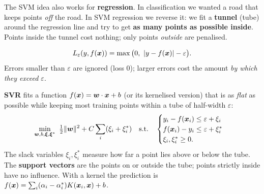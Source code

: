 The SVM idea also works for \textbf{regression}. In classification we wanted a road that keeps points \emph{off} the road. In SVM regression we reverse it: we fit a \textbf{tunnel} (tube) around the regression line and try to get \textbf{as many points as possible inside}. Points inside the tunnel cost nothing; only points \emph{outside} are penalised.

\begin{definition}
\[
  L_\varepsilon(y,f(\vect x))=\max\big(0,\ |y-f(\vect x)|-\varepsilon\big).
\]
Errors smaller than $\varepsilon$ are ignored (loss $0$); larger errors cost the amount \emph{by which they exceed $\varepsilon$}.
\end{definition}

\begin{definition}
\textbf{SVR} fits a function $f(\boldsymbol{x})=\boldsymbol{w}\cdot\boldsymbol{x}+b$ (or its kernelised version) that is as \emph{flat} as possible while keeping most training points within a tube of half-width $\varepsilon$:
\[
  \min_{\vect w,b,\vect\xi,\vect\xi^*}\ \tfrac12\|\vect w\|^2+C\sum_i(\xi_i+\xi_i^*)
  \quad\text{s.t.}\quad
  \begin{cases}y_i-f(\vect x_i)\le\varepsilon+\xi_i\\ f(\vect x_i)-y_i\le\varepsilon+\xi_i^*\\ \xi_i,\xi_i^*\ge0.\end{cases}
\]
The slack variables $\xi_i,\xi_i^*$ measure how far a point lies above or below the tube. The \textbf{support vectors} are the points on or outside the tube; points strictly inside have no influence. With a kernel the prediction is $f(\boldsymbol{x})=\sum_i(\alpha_i-\alpha_i^*)K(\boldsymbol{x}_i,\boldsymbol{x})+b$.
\end{definition}

